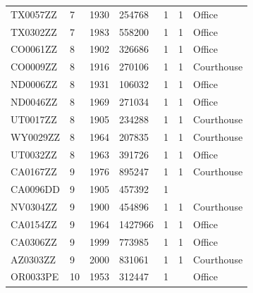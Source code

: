 \documentclass[12pt]{article}
\begin{document}
\begin{longtable}{lllllll}
TX0057ZZ         & 7      & 1930        & 254768                     & 1     & 1            & Office                           \\
TX0302ZZ         & 7      & 1983        & 558200                     & 1     & 1            & Office                           \\
CO0061ZZ         & 8      & 1902        & 326686                     & 1     & 1            & Office                           \\
CO0009ZZ         & 8      & 1916        & 270106                     & 1     & 1            & Courthouse                       \\
ND0006ZZ         & 8      & 1931        & 106032                     & 1     & 1            & Office                           \\
ND0046ZZ         & 8      & 1969        & 271034                     & 1     & 1            & Office                           \\
UT0017ZZ         & 8      & 1905        & 234288                     & 1     & 1            & Courthouse                       \\
WY0029ZZ         & 8      & 1964        & 207835                     & 1     & 1            & Courthouse                       \\
UT0032ZZ         & 8      & 1963        & 391726                     & 1     & 1            & Office                           \\
CA0167ZZ         & 9      & 1976        & 895247                     & 1     & 1            & Courthouse                       \\
CA0096DD         & 9      & 1905        & 457392                     & 1     &              &                                  \\
NV0304ZZ         & 9      & 1900        & 454896                     & 1     & 1            & Courthouse                       \\
CA0154ZZ         & 9      & 1964        & 1427966                    & 1     & 1            & Office                           \\
CA0306ZZ         & 9      & 1999        & 773985                     & 1     & 1            & Office                           \\
AZ0303ZZ         & 9      & 2000        & 831061                     & 1     & 1            & Courthouse                       \\
OR0033PE         & 10     & 1953        & 312447                     & 1     &              & Office                           \\

\end{longtable}
\end{document}

